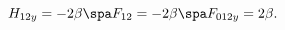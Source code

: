 \begin{equation}
\label{fluxgodeld5}
H_{12y} = - 2\beta \spa
F_{12} = - 2\beta \spa
F_{012y} = 2\beta.
\end{equation}

